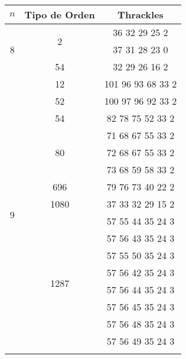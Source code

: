 \label{apendice_thrackles_inducen}
  \begin{tabular}[t]{|c|c|c|}
    \hline
    $n$                 & Tipo de Orden       & Thrackles             \\ \hline \hline
    \multirow{3}{*}{8}  & \multirow{2}{*}{2}  & 36 32 29 25 2         \\ \cline{3-3}
                        &                     & 37 31 28 23 0         \\ \cline{2-3}
                        & 54                  & 32 29 26 16 2         \\ \hline
    \multirow{23}{*}{9} & 12                  & 101 96 93 68 33 2     \\ \cline{2-3}
                        & 52                  & 100 97 96 92 33 2     \\ \cline{2-3}
                        & 54                  & 82 78 75 52 33 2      \\ \cline{2-3}
                        & \multirow{3}{*}{80} & 71 68 67 55 33 2      \\ \cline{3-3}
                        &                     & 72 68 67 55 33 2      \\ \cline{3-3}
                        &                     & 73 68 59 58 33 2      \\ \cline{3-3}
                        & 696                 & 79 76 73 40 22 2      \\ \cline{2-3}
                        & 1080                & 37 33 32 29 15 2      \\ \cline{2-3}
                        &\multirow{15}{*}{1287}& 57 55 44 35 24 3      \\ \cline{3-3}
                        &                     & 57 56 43 35 24 3      \\ \cline{3-3}
                        &                     & 57 55 50 35 24 3      \\ \cline{3-3}
                        &                     & 57 56 42 35 24 3      \\ \cline{3-3}
                        &                     & 57 56 44 35 24 3      \\ \cline{3-3}
                        &                     & 57 56 45 35 24 3      \\ \cline{3-3}
                        &                     & 57 56 48 35 24 3      \\ \cline{3-3}
                        &                     & 57 56 49 35 24 3      \\ \cline{3-3}

\end{tabular}
